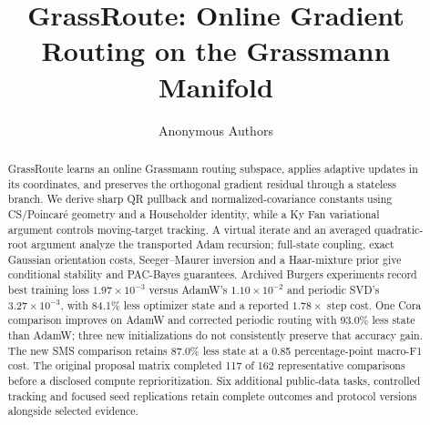 \documentclass{article}
\title{GrassRoute: Online Gradient Routing on the Grassmann Manifold}
\author{Anonymous Authors}
\date{}
\begin{document}
\maketitle
\begin{abstract}
GrassRoute learns an online Grassmann routing subspace, applies adaptive
updates in its coordinates, and preserves the orthogonal gradient residual
through a stateless branch. We derive sharp QR pullback and normalized-covariance
constants using CS/Poincar\'e geometry and a Householder identity, while a Ky Fan
variational argument controls moving-target tracking. A virtual iterate and
an averaged quadratic-root argument analyze the transported Adam recursion;
full-state coupling, exact Gaussian orientation costs, Seeger--Maurer inversion
and a Haar-mixture prior give conditional stability and PAC-Bayes guarantees.
Archived Burgers experiments record best training loss $1.97\times10^{-3}$
versus AdamW's $1.10\times10^{-2}$ and periodic SVD's $3.27\times10^{-3}$,
with 84.1\% less optimizer state and a reported $1.78\times$ step cost.
One Cora comparison improves on AdamW and corrected periodic
routing with 93.0\% less state than AdamW; three new initializations do not
consistently preserve that accuracy gain. The new SMS comparison
retains 87.0\% less state at a 0.85 percentage-point macro-F1 cost.
The original proposal matrix completed 117 of 162 representative comparisons
before a disclosed compute reprioritization. Six additional public-data tasks,
controlled tracking and focused seed replications retain complete outcomes
and protocol versions alongside selected evidence.
\end{abstract}







\clearpage

\clearpage
\appendix














\end{document}
